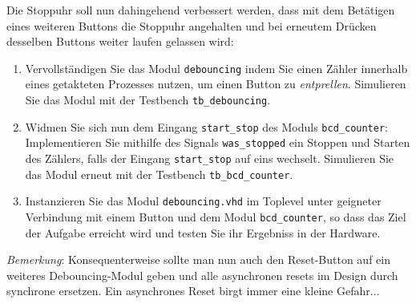 \documentclass[12pt]{article}
\begin{document}


Die Stoppuhr soll nun dahingehend verbessert werden, dass mit dem Betätigen eines weiteren Buttons die Stoppuhr angehalten und bei erneutem Drücken desselben Buttons weiter laufen gelassen wird:


\begin{enumerate}[label=\alph*.)]


\item Vervollständigen Sie das Modul \texttt{debouncing} indem Sie einen Zähler innerhalb eines getakteten Prozesses nutzen, um einen Button zu \textit{entprellen}.
Simulieren Sie das Modul mit der Testbench \texttt{tb\_debouncing}.


\item Widmen Sie sich nun dem Eingang \texttt{start\_stop} des Moduls \texttt{bcd\_counter}:\\
Implementieren Sie mithilfe des Signals \texttt{was\_stopped} ein Stoppen und Starten des Zählers, falls der Eingang \texttt{start\_stop} auf eins wechselt.
Simulieren Sie das Modul erneut mit der Testbench \texttt{tb\_bcd\_counter}.


\item Instanzieren Sie das Modul \texttt{debouncing.vhd} im Toplevel unter geigneter Verbindung mit einem Button und dem Modul \texttt{bcd\_counter}, so dass das Ziel der Aufgabe erreicht wird und testen Sie ihr Ergebniss in der Hardware.


\end{enumerate}


\textit{Bemerkung}: Konsequenterweise sollte man nun auch den Reset-Button auf ein weiteres Debouncing-Modul geben und alle asynchronen resets im Design durch synchrone ersetzen. Ein asynchrones Reset birgt immer eine kleine Gefahr...
\end{document}
